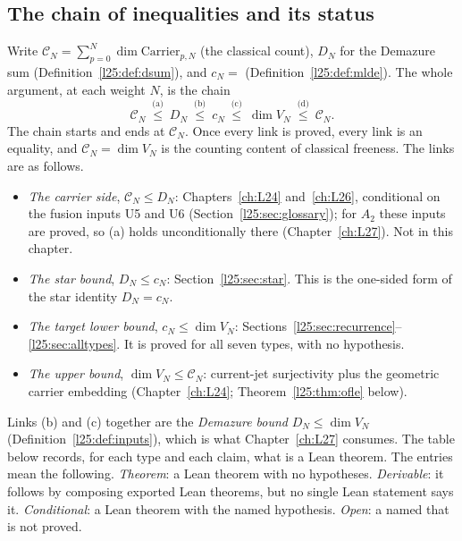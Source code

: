\subsection{The chain of inequalities and its status}\label{l25:sec:chain}

Write $\mathcal C_N=\sum_{p=0}^N\dim\mathrm{Carrier}_{p,N}$ (the classical count), $D_N$ for the Demazure sum
(Definition~\ref{l25:def:dsum}), and $c_N=$ (Definition~\ref{l25:def:mlde}).
The whole argument, at each weight $N$, is the chain
\begin{equation}\label{l25:eq:chain}
\mathcal C_N\ \overset{\text{(a)}}{\le}\ D_N\ \overset{\text{(b)}}{\le}\ c_N\ \overset{\text{(c)}}{\le}\ \dim V_N
\ \overset{\text{(d)}}{\le}\ \mathcal C_N .
\end{equation}
The chain starts and ends at $\mathcal C_N$. Once every link is proved, every link is an equality, and
$\mathcal C_N=\dim V_N$ is the counting content of classical freeness. The links are as follows.
\begin{itemize}
\item[(a)] \emph{The carrier side}, $\mathcal C_N\le D_N$: Chapters~\ref{ch:L24} and~\ref{ch:L26}, conditional on
  the fusion inputs U5 and U6 (Section~\ref{l25:sec:glossary}); for $A_2$ these inputs are proved, so (a) holds
  unconditionally there (Chapter~\ref{ch:L27}). Not in this chapter.
\item[(b)] \emph{The star bound}, $D_N\le c_N$: Section~\ref{l25:sec:star}. This is the one-sided form of the star
  identity $D_N=c_N$.
\item[(c)] \emph{The target lower bound}, $c_N\le\dim V_N$: Sections~\ref{l25:sec:recurrence}--\ref{l25:sec:alltypes}.
  It is proved for all seven types, with no hypothesis.
\item[(d)] \emph{The upper bound}, $\dim V_N\le\mathcal C_N$: current-jet surjectivity plus the geometric carrier
  embedding (Chapter~\ref{ch:L24}; Theorem~\ref{l25:thm:ofle} below).
\end{itemize}
Links (b) and (c) together are the \emph{Demazure bound} $D_N\le\dim V_N$ (Definition~\ref{l25:def:inputs}), which
is what Chapter~\ref{ch:L27} consumes. The table below records, for each type and each claim, what is a Lean
theorem. The entries mean the following. \emph{Theorem}: a Lean theorem with no hypotheses. \emph{Derivable}: it
follows by composing exported Lean theorems, but no single Lean statement says it. \emph{Conditional}: a Lean
theorem with the named hypothesis. \emph{Open}: a named  that is not proved.
